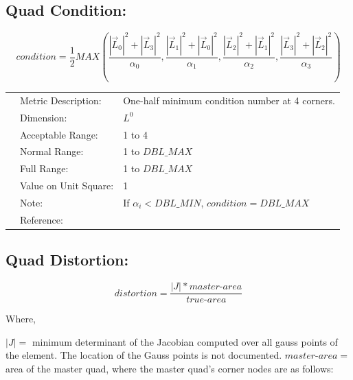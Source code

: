 \documentclass[12pt]{article}
\begin{document}
\subsection*{Quad Condition:}

\begin{displaymath}
condition = \frac{1}{2} MAX \left(  \frac {|\vec L_0|^2 + |\vec L_3|^2 } { \alpha_0 },
                        \frac {|\vec L_1|^2 + |\vec L_0|^2 } { \alpha_1 },
                        \frac {|\vec L_2|^2 + |\vec L_1|^2 } { \alpha_2 },
                        \frac {|\vec L_3|^2 + |\vec L_2|^2 } { \alpha_3 } 
                \right)
\end{displaymath}

\begin{tabular}{lll}
& Metric Description:  & One-half minimum condition number at 4 corners. \\
& Dimension:           & $L^0$  \\
& Acceptable Range:    & 1 to 4 \\ 
& Normal Range:        & 1 to $DBL\_MAX$ \\ 
& Full Range:          & 1 to $DBL\_MAX$ \\ 
& Value on Unit Square:& 1 \\
& Note:                & If $\alpha_i< DBL\_MIN$, $condition = DBL\_MAX$  \\
& Reference:           &  \cite{three} \\
\end{tabular} 

\subsection*{Quad Distortion:}

\begin{displaymath}
distortion = \frac{ |J|*master\textrm{-}area } { true\textrm{-}area }  
\end{displaymath}

\begin{flushleft} Where, \end{flushleft}
$|J| = $ minimum determinant of the Jacobian computed over all gauss points  \newline
of the element.  The location of the Gauss points is not documented. \newline 
$master\textrm{-}area =$ area of the master quad, where the master quad's corner \newline
nodes are as follows: \newline
\end{document}
